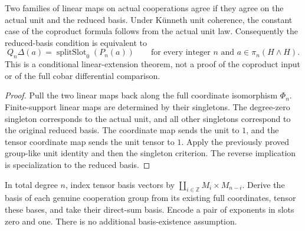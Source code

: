 \begin{proposition}
  \label{prop:h6-milnor-coproduct-linear-extension}
  \leanok
  Two families of linear maps on actual cooperations agree if they agree
  on the actual unit and the reduced basis. Under K\"unneth unit coherence,
  the constant case of the coproduct formula follows from the actual unit
  law. Consequently the reduced-basis condition is equivalent to
  \[
    Q_n\Delta(a)=\operatorname{splitSlot}_0(P_n(a))
    \qquad\text{for every integer }n\text{ and }a\in\pi_n(H\wedge H).
  \]
  This is a conditional linear-extension theorem, not a proof of the
  coproduct input or of the full cobar differential comparison.
\end{proposition}
\begin{proof}
  Pull the two linear maps back along the full coordinate isomorphism
  $\Phi_n$. Finite-support linear maps are determined by their singletons.
  The degree-zero singleton corresponds to the actual unit, and all other
  singletons correspond to the original reduced basis. The coordinate
  map sends the unit to $1$, and the tensor coordinate map sends the unit
  tensor to $1$. Apply the previously proved group-like unit identity and
  then the singleton criterion. The reverse implication is specialization
  to the reduced basis.
  \leanok
\end{proof}

\begin{definition}
  \label{def:h6-milnor-tensor-basis}
  \leanok
  In total degree $n$, index tensor basis vectors by
  $\coprod_{i\in\mathbb Z} M_i\times M_{n-i}$.
  Derive the basis of each genuine cooperation group from its existing
  full coordinates, tensor these bases, and take their direct-sum basis.
  Encode a pair of exponents in slots zero and one. There is no additional
  basis-existence assumption.
\end{definition}

